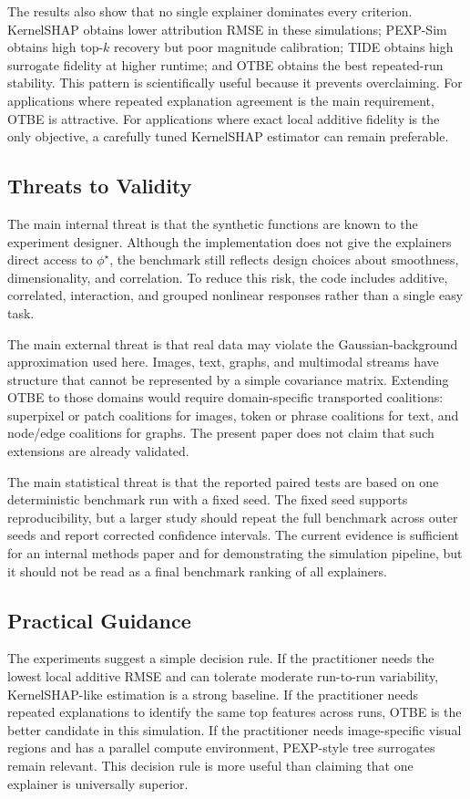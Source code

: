 \documentclass[10pt,conference,letterpaper]{IEEEtran}
\newcommand{\method}{OTBE}
\begin{document}
The results also show that no single explainer dominates every criterion.  KernelSHAP obtains lower attribution RMSE in these simulations; PEXP-Sim obtains high top-$k$ recovery but poor magnitude calibration; TIDE obtains high surrogate fidelity at higher runtime; and \method{} obtains the best repeated-run stability.  This pattern is scientifically useful because it prevents overclaiming.  For applications where repeated explanation agreement is the main requirement, \method{} is attractive.  For applications where exact local additive fidelity is the only objective, a carefully tuned KernelSHAP estimator can remain preferable.

\subsection{Threats to Validity}
The main internal threat is that the synthetic functions are known to the experiment designer.  Although the implementation does not give the explainers direct access to $\phi^\star$, the benchmark still reflects design choices about smoothness, dimensionality, and correlation.  To reduce this risk, the code includes additive, correlated, interaction, and grouped nonlinear responses rather than a single easy task.

The main external threat is that real data may violate the Gaussian-background approximation used here.  Images, text, graphs, and multimodal streams have structure that cannot be represented by a simple covariance matrix.  Extending \method{} to those domains would require domain-specific transported coalitions: superpixel or patch coalitions for images, token or phrase coalitions for text, and node/edge coalitions for graphs.  The present paper does not claim that such extensions are already validated.

The main statistical threat is that the reported paired tests are based on one deterministic benchmark run with a fixed seed.  The fixed seed supports reproducibility, but a larger study should repeat the full benchmark across outer seeds and report corrected confidence intervals.  The current evidence is sufficient for an internal methods paper and for demonstrating the simulation pipeline, but it should not be read as a final benchmark ranking of all explainers.

\subsection{Practical Guidance}
The experiments suggest a simple decision rule.  If the practitioner needs the lowest local additive RMSE and can tolerate moderate run-to-run variability, KernelSHAP-like estimation is a strong baseline.  If the practitioner needs repeated explanations to identify the same top features across runs, \method{} is the better candidate in this simulation.  If the practitioner needs image-specific visual regions and has a parallel compute environment, PEXP-style tree surrogates remain relevant.  This decision rule is more useful than claiming that one explainer is universally superior.
\end{document}
